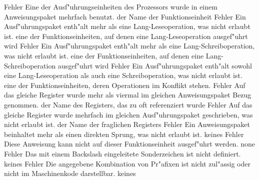 \documentclass[12pt,a4paper,twoside]{report}
\begin{document}
{\begin{description}
               {Fehler}
               {Eine der Ausf"uhrungseinheiten des Prozessors wurde in
                einem Anweisungspaket mehrfach benutzt.}
               {der Name der Funktionseinheit}
               {Fehler}
               {Ein Ausf"uhrungspaket enth"alt mehr als eine
                Lang-Leseoperation, was nicht erlaubt ist.}
               {eine der Funktionseinheiten, auf denen eine
                Lang-Leseoperation ausgef"uhrt wird}
               {Fehler}
               {Ein Ausf"uhrungspaket enth"alt mehr als eine
                Lang-Schreiboperation, was nicht erlaubt ist.}
               {eine der Funktionseinheiten, auf denen eine 
                Lang-Schreiboperation ausgef"uhrt wird}
               {Fehler}
               {Ein Ausf"uhrungspaket enth"alt sowohl eine
                Lang-Leseoperation als auch eine Schreiboperation,
                was nicht erlaubt ist.}
               {eine der Funktionseinheiten, deren Operationen im
                Konflikt stehen.}
               {Fehler}
               {Auf das gleiche Register wurde mehr als viermal im
                gleichen Anweisungspaket Bezug genommen.}
               {der Name des Registers, das zu oft referenziert wurde}
               {Fehler}
               {Auf das gleiche Register wurde mehrfach im gleichen
                Ausf"uhrungspaket geschrieben, was nicht erlaubt ist.}
               {der Name der fraglichen Registers}
               {Fehler}
               {Ein Anweisungspaket beinhaltet mehr als einen direkten
                Sprung, was nicht erlaubt ist.}
               {keines}
               {Fehler}
               {Diese Anweisung kann nicht auf dieser Funktionseinheit 
                ausgef"uhrt werden.}
               {none}
               {Fehler}
               {Das mit einem Backslash eingeleitete
	        Sonderzeichen ist nicht definiert.}
               {keines}
               {Fehler}
               {Die angegebene Kombination von Pr"afixen
	        ist nicht zul"assig oder nicht im
	        Maschinenkode darstellbar.}
               {keines}

\end{description}}
\end{document}
